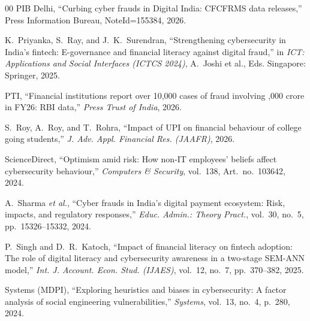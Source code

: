\documentclass[journal,10pt,twocolumn]{IEEEtran}
\begin{document}
\begin{thebibliography}{00}
 PIB Delhi, ``Curbing cyber frauds in Digital India: CFCFRMS data releases,'' Press Information Bureau, NoteId=155384, 2026.

 K.~Priyanka, S.~Ray, and J.~K.~Surendran, ``Strengthening cybersecurity in India's fintech: E-governance and financial literacy against digital fraud,'' in \textit{ICT: Applications and Social Interfaces (ICTCS 2024)}, A.~Joshi et al., Eds. Singapore: Springer, 2025.

 PTI, ``Financial institutions report over 10,000 cases of fraud involving ,000 crore in FY26: RBI data,'' \textit{Press Trust of India}, 2026.

 S.~Roy, A.~Roy, and T.~Rohra, ``Impact of UPI on financial behaviour of college going students,'' \textit{J. Adv. Appl. Financial Res. (JAAFR)}, 2026.

 ScienceDirect, ``Optimism amid risk: How non-IT employees' beliefs affect cybersecurity behaviour,'' \textit{Computers \& Security}, vol.~138, Art.~no.~103642, 2024.

 A.~Sharma \textit{et al.}, ``Cyber frauds in India's digital payment ecosystem: Risk, impacts, and regulatory responses,'' \textit{Educ. Admin.: Theory Pract.}, vol.~30, no.~5, pp.~15326--15332, 2024.

 P.~Singh and D.~R.~Katoch, ``Impact of financial literacy on fintech adoption: The role of digital literacy and cybersecurity awareness in a two-stage SEM-ANN model,'' \textit{Int. J. Account. Econ. Stud. (IJAES)}, vol.~12, no.~7, pp.~370--382, 2025.

 Systems (MDPI), ``Exploring heuristics and biases in cybersecurity: A factor analysis of social engineering vulnerabilities,'' \textit{Systems}, vol.~13, no.~4, p.~280, 2024.

\end{thebibliography}
\end{document}
